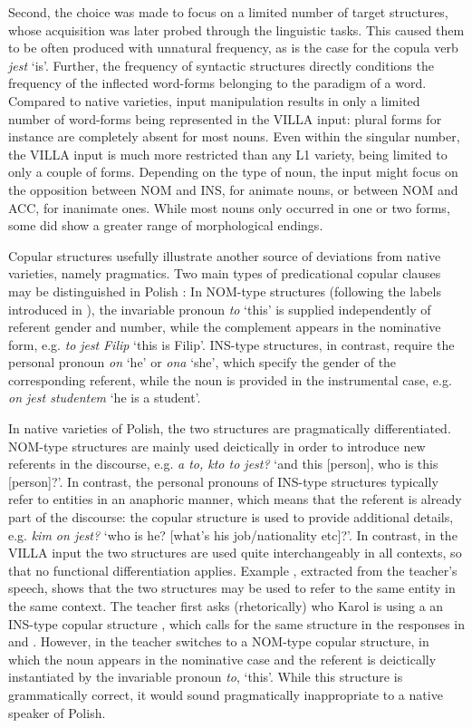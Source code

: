 Second, the choice was made to focus on a limited number of target structures, whose acquisition was later probed through the linguistic tasks. This caused them to be often produced with unnatural frequency, as is the case for the copula verb \textit{jest} ‘is’. Further, the frequency of syntactic structures directly conditions the frequency of the inflected word-forms belonging to the paradigm of a word. Compared to native varieties, input manipulation results in only a limited number of word-forms being represented in the VILLA input: plural forms for instance are completely absent for most nouns. Even within the singular number, the VILLA input is much more restricted than any L1 variety, being limited to only a couple of forms. Depending on the type of noun, the input might focus on the opposition between NOM and INS, for animate nouns, or between NOM and ACC, for inanimate ones. While most nouns only occurred in one or two forms, some did show a greater range of morphological endings. 

Copular structures usefully illustrate another source of deviations from native varieties, namely pragmatics. Two main types of predicational copular clauses may be distinguished in Polish \citep{Bondaruk2013}: In NOM-type structures (following the labels introduced in \citealt{Saturno2015}), the invariable pronoun \textit{to} ‘this’ is supplied independently of referent gender and number, while the complement appears in the nominative form, e.g. \textit{to} \textit{jest} \textit{Filip} ‘this is Filip’. INS-type structures, in contrast, require the personal pronoun \textit{on} ‘he’ or \textit{ona} ‘she’, which specify the gender of the corresponding referent, while the noun is provided in the instrumental case, e.g. \textit{on jest studentem} ‘he is a student’.

In native varieties of Polish, the two structures are pragmatically differentiated. NOM-type structures are mainly used deictically in order to introduce new referents in the discourse, e.g. \textit{a to, kto to jest?} ‘and this [person], who is this [person]?’. In contrast, the personal pronouns of INS-type structures typically refer to entities in an anaphoric manner, which means that the referent is already part of the discourse: the copular structure is used to provide additional details, e.g. \textit{kim on jest?} ‘who is he? [what's his job/nationality etc]?’. In contrast, in the VILLA input the two structures are used quite interchangeably in all contexts, so that no functional differentiation applies. Example , extracted from the teacher's speech, shows that the two structures may be used to refer to the same entity in the same context. The teacher first asks (rhetorically) who Karol is using a an INS-type copular structure , which calls for the same structure in the responses in  and . However, in  the teacher switches to a NOM-type copular structure, in which the noun appears in the nominative case and the referent is deictically instantiated by the invariable pronoun \textit{to}, ‘this’. While this structure is grammatically correct, it would sound pragmatically inappropriate to a native speaker of Polish.

